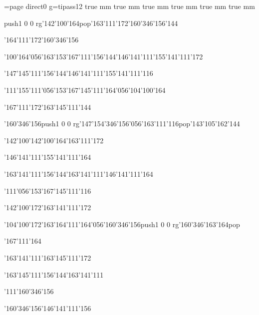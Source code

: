 \chardef\match=\pdfcolorstackinit page direct{0 g}\nopagenumbers\font\ipa=tipass12 true mm true mm true mm true mm true mm true mm
\null\vfill\ipa\centerline{\enskip\pdfcolorstack\match push{1 0 0 rg}\char'142\char'100\char'164\pdfcolorstack\match pop{}\enskip\enskip\enskip\enskip\enskip\char'163\char'111\char'172\enskip\char'160\char'346\char'156\char'144}\medskip\centerline{\enskip\char'164\char'111\char'172\enskip\enskip\enskip\enskip\enskip\enskip\enskip\enskip\char'160\char'346\char'156}\medskip\centerline{\enskip\char'100\char'164\char'056\char'163\char'153\char'167\char'111\char'156\char'144\enskip\char'146\char'141\char'111\enskip\char'155\char'141\char'111\char'172}\medskip\centerline{\enskip\enskip\enskip\enskip\char'147\char'145\char'111\char'156\char'144\enskip\char'146\char'141\char'111\enskip\char'155\char'141\char'111\char'116}\medskip\centerline{\enskip\char'111\char'155\enskip\enskip\enskip\char'111\char'056\char'153\char'167\char'145\char'111\char'164\char'056\char'104\char'100\char'164}\medskip\centerline{\enskip\char'167\char'111\char'172\enskip\enskip\enskip\enskip\char'163\char'145\char'111\char'144}\medskip\vfill\footline{\hfil\tt\folio\hfil}\eject
\null\vfill\ipa\centerline{\enskip\char'160\char'346\char'156\enskip\pdfcolorstack\match push{1 0 0 rg}\char'147\char'154\char'346\char'156\char'056\char'163\char'111\char'116\pdfcolorstack\match pop{}\enskip\char'143\char'105\char'162\char'144}\medskip\centerline{\enskip\char'142\char'100\char'142\enskip\char'100\char'164\enskip\char'163\char'111\char'172\enskip\enskip\enskip\enskip}\medskip\centerline{\enskip\enskip\enskip\enskip\enskip\enskip\enskip\enskip\enskip\enskip\char'146\char'141\char'111\enskip\char'155\char'141\char'111\char'164}\medskip\centerline{\enskip\enskip\enskip\enskip\char'163\char'141\char'111\char'156\char'144\enskip\char'163\char'141\char'111\enskip\char'146\char'141\char'111\char'164}\medskip\centerline{\enskip\enskip\enskip\enskip\enskip\enskip\char'111\char'056\char'153\char'167\char'145\char'111\char'116\enskip\enskip\enskip\enskip}\medskip\centerline{\enskip\char'142\char'100\char'172\enskip\enskip\enskip\enskip\char'163\char'141\char'111\char'172}\medskip\vfill\footline{\hfil\tt\folio\hfil}\eject
\null\vfill\ipa\centerline{\enskip\char'104\char'100\char'172\enskip\char'163\char'164\char'111\char'164\char'056\char'160\char'346\char'156\enskip\pdfcolorstack\match push{1 0 0 rg}\char'160\char'346\char'163\char'164\pdfcolorstack\match pop{}}\medskip\centerline{\enskip\char'167\char'111\char'164\enskip\enskip\enskip\enskip\enskip\enskip\enskip\enskip\enskip\enskip\enskip}\medskip\centerline{\enskip\enskip\enskip\enskip\enskip\enskip\enskip\enskip\enskip\enskip\char'163\char'141\char'111\enskip\char'163\char'145\char'111\char'172}\medskip\centerline{\enskip\enskip\enskip\enskip\char'163\char'145\char'111\char'156\char'144\enskip\char'163\char'141\char'111\enskip\enskip\enskip\enskip\enskip}\medskip\centerline{\enskip\enskip\enskip\enskip\enskip\enskip\char'111\enskip\enskip\enskip\enskip\enskip\enskip\char'160\char'346\char'156}\medskip\centerline{\enskip\char'160\char'346\char'156\enskip\enskip\enskip\enskip\char'146\char'141\char'111\char'156}\medskip\vfill\footline{\hfil\tt\folio\hfil}\eject

